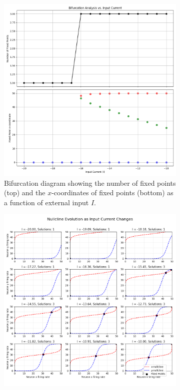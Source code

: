 \documentclass{article}
\begin{document}
\begin{figure}[H]
    \centering
    \begin{subfigure}{0.48\textwidth}
        \includegraphics[width=\textwidth]{bifurcation_analysis_22.png}
        \caption{Bifurcation diagram showing the number of fixed points (top) and the $x$-coordinates of fixed points (bottom) as a function of external input $I$.}
        \label{fig:bifurcation_matrix}
    \end{subfigure}
    \hfill
    \begin{subfigure}{0.48\textwidth}
        \includegraphics[width=\textwidth]{nullcline_evolution_2.png}

\end{subfigure}
\end{figure}
\end{document}
